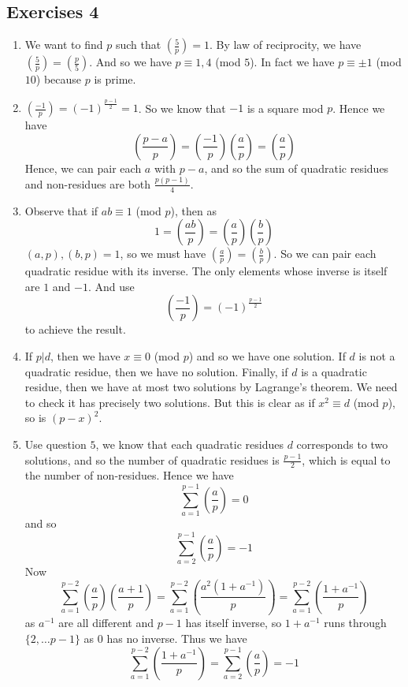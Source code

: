 \subsection{Exercises 4}
\begin{enumerate}
\item We want to find $p$ such that $(\frac{5}{p})=1$. By law of reciprocity, we have
    $(\frac{5}{p})=(\frac{p}{5})$. And so we have $p \equiv 1,4$ (mod $5$). In fact we have
    $p \equiv \pm 1$ (mod $10$) because $p$ is prime.
\item $(\frac{-1}{p})=(-1)^{\frac{p-1}{2}} =1$. So we know that $-1$ is a square mod $p$. Hence we have
    $$\left(\frac{p-a}{p}\right)=\left(\frac{-1}{p}\right)\left(\frac{a}{p}\right)
    =\left(\frac{a}{p}\right)$$
    Hence, we can pair each $a$ with $p-a$, and so the sum of quadratic residues and non-residues are both $\frac{p(p-1)}{4}$.\\
\item Observe that if $ab \equiv 1$ (mod $p$), then as
$$1=\left(\frac{ab}{p}\right)=\left(\frac{a}{p}\right)\left(\frac{b}{p}\right)$$
$(a,p),(b,p)=1$, so we must have $(\frac{a}{p})=(\frac{b}{p})$. So we can pair each quadratic residue with its inverse. The only elements whose inverse is itself are $1$ and $-1$. And use
$$\left(\frac{-1}{p}\right)=(-1)^{\frac{p-1}{2}}$$ to achieve the result.
\item If $p|d$, then we have $x \equiv 0$ (mod $p$) and so we have one solution. If $d$ is not a quadratic residue, then we have no solution. Finally, if $d$ is a quadratic residue, then we have at most two solutions by Lagrange's theorem. We need to check it has precisely two solutions. But this is clear as if $x^2 \equiv d$ (mod $p$), so is $(p-x)^2$.
\item Use question $5$, we know that each quadratic residues $d$ corresponds to two solutions, and so the number of quadratic residues is $\frac{p-1}{2}$, which is equal to the number of non-residues. Hence we have
    $$\sum_{a=1}^{p-1} \left(\frac{a}{p}\right)=0$$
    and so
    $$\sum_{a=2}^{p-1} \left(\frac{a}{p}\right)=-1$$
    Now $$\sum_{a=1}^{p-2}\left(\frac{a}{p}\right)\left(\frac{a+1}{p}\right)
    =\sum_{a=1}^{p-2}\left(\frac{a^2(1+a^{-1})}{p}\right)
    =\sum_{a=1}^{p-2}\left(\frac{1+a^{-1}}{p}\right)$$
    as $a^{-1}$ are all different and $p-1$ has itself inverse, so $1+a^{-1}$ runs through $\{2,\ldots p-1\}$ as $0$ has no inverse. Thus we have
    $$\sum_{a=1}^{p-2}\left(\frac{1+a^{-1}}{p}\right)=\sum_{a=2}^{p-1}\left(\frac{a}{p}\right)=-1$$\\

\end{enumerate}

